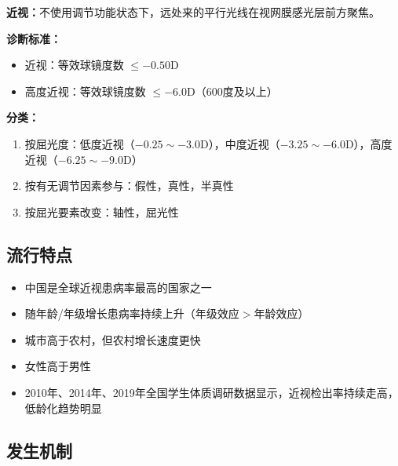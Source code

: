 \begin{defbox}
\textbf{近视：}不使用调节功能状态下，远处来的平行光线在视网膜感光层前方聚焦。

\textbf{诊断标准：}
\begin{itemize}[leftmargin=*]
    \item 近视：等效球镜度数 $\leq -0.50$D
    \item 高度近视：等效球镜度数 $\leq -6.0$D（600度及以上）
\end{itemize}

\textbf{分类：}
\begin{enumerate}[leftmargin=*]
    \item 按屈光度：低度近视（$-0.25\sim-3.0$D），中度近视（$-3.25\sim-6.0$D），高度近视（$-6.25\sim-9.0$D）
    \item 按有无调节因素参与：假性，真性，半真性
    \item 按屈光要素改变：轴性，屈光性
\end{enumerate}
\end{defbox}

\subsection{流行特点}

\begin{keybox}
\begin{itemize}[leftmargin=*]
    \item 中国是全球近视患病率最高的国家之一
    \item 随年龄/年级增长患病率持续上升（年级效应$>$年龄效应）
    \item 城市高于农村，但农村增长速度更快
    \item 女性高于男性
    \item 2010年、2014年、2019年全国学生体质调研数据显示，近视检出率持续走高，低龄化趋势明显
\end{itemize}
\end{keybox}

\subsection{发生机制}

